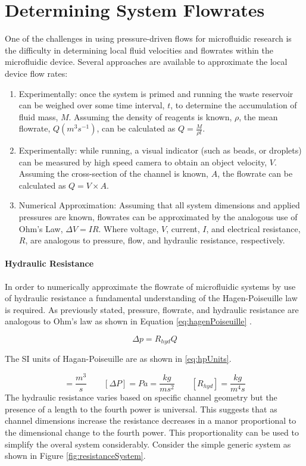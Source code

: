 \section{Determining System Flowrates}

One of the challenges in using pressure-driven flows for microfluidic research is the difficulty in determining local fluid velocities and flowrates within the microfluidic device. Several approaches are available to approximate the local device flow rates:
\begin{enumerate}
\item Experimentally: once the system is primed and running the waste reservoir can be weighed over some time interval, $t$, to determine the accumulation of fluid mass, $M$. Assuming the density of reagents is known, $\rho$, the mean flowrate, $Q (m^3s^{-1})$, can be calculated as $Q = \frac{M}{\rho t}$.
\item Experimentally: while running, a visual indicator (such as beads, or droplets) can be measured by high speed camera to obtain an object velocity, $V$. Assuming the cross-section of the channel is known, $A$, the flowrate can be calculated as $Q = V \times A$.
\item Numerical Approximation: Assuming that all system dimensions and applied pressures are known, flowrates can be approximated by the analogous use of Ohm's Law, $\Delta V=IR$. Where voltage, $V$, current, $I$, and electrical resistance, $R$, are analogous to pressure, flow, and hydraulic resistance, respectively.
\end{enumerate}


\paragraph{Hydraulic Resistance} In order to numerically approximate the flowrate of microfluidic systems by use of hydraulic resistance a fundamental understanding of the Hagen-Poiseuille law is required. As previously stated, pressure, flowrate, and hydraulic resistance are analogous to Ohm's law as shown in Equation \vref{eq:hagenPoiseuille} \cite{Bruus2008}.

\begin{equation}
\Delta p  = R_{hyd} Q
\label{eq:hagenPoiseuille}
\end{equation}

The SI units of Hagan-Poiseuille are as shown in \vref{eq:hpUnits}.

\begin{equation}
[Q] = \frac{m^3}{s} \qquad [\Delta P] = Pa = \frac{kg}{m s^2}  \qquad [R_{hyd}]= \frac{kg}{m^4 s}
\label{eq:hpUnits}
\end{equation}
The hydraulic resistance varies based on specific channel geometry but the presence of a length to the fourth power is universal. This suggests that as channel dimensions increase the resistance decreases in a manor proportional to the dimensional change to the fourth power. This proportionality can be used to simplify the overal system considerably. Consider the simple generic system as shown in Figure \vref{fig:resistanceSystem}.



